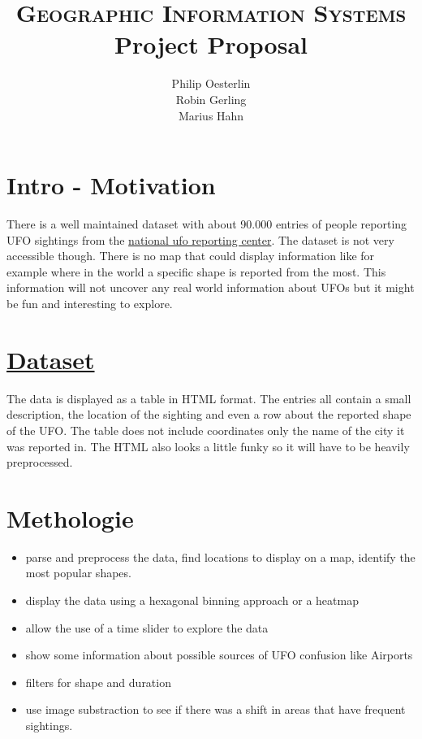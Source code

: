 \documentclass{scrartcl}
\title{\textsc{Geographic Information Systems} \\ 
        Project Proposal}
\author{ 
    Philip Oesterlin \\
    Robin Gerling \\
    Marius Hahn \\ 
       }
\begin{document}
\maketitle
\newpage

\section{Intro - Motivation}
There is a well maintained dataset with about 90.000 entries of people reporting UFO
sightings from the \href{http://www.nuforc.org/}{national ufo reporting center}. The dataset is not very accessible
though. There is no map that could display information like for example where in the
world a specific shape is reported from the most. This information will not uncover any
real world information about UFOs but it might be fun and interesting to explore.

\section{\href{http://www.nuforc.org/webreports/ndxevent.html}{Dataset}}
The data is displayed as a table in HTML format. The entries all contain a small description,
the location of the sighting and even a row about the reported shape of the UFO.
The table does not include coordinates only the name of the city it was reported in.
The HTML also looks a little funky so it will have to be heavily preprocessed.


\section{Methologie}
\begin{itemize}
        \item parse and preprocess the data, find locations to display on a map, identify the most popular shapes.
        \item display the data using a hexagonal binning approach or a heatmap
        \item allow the use of a time slider to explore the data
        \item show some information about possible sources of UFO confusion like Airports
        \item filters for shape and duration
        \item use image substraction to see if there was a shift in areas that have frequent sightings.
\end{itemize}
\end{document}
